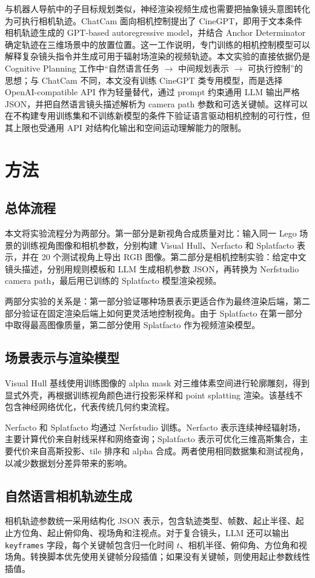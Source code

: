 \documentclass[a4paper, 12pt, centering]{article}
\begin{document}
与机器人导航中的子目标规划类似，神经渲染视频生成也需要把抽象镜头意图转化为可执行相机轨迹。ChatCam 面向相机控制提出了 CineGPT，即用于文本条件相机轨迹生成的 GPT-based autoregressive model，并结合 Anchor Determinator 确定轨迹在三维场景中的放置位置\cite{liu2024chatcam}。这一工作说明，专门训练的相机控制模型可以解释复杂镜头指令并生成可用于辐射场渲染的视频轨迹。本文实验的直接依据仍是 Cognitive Planning 工作中“自然语言任务 $\rightarrow$ 中间规划表示 $\rightarrow$ 可执行控制”的思想；与 ChatCam 不同，本文没有训练 CineGPT 类专用模型，而是选择 OpenAI-compatible API 作为轻量替代，通过 prompt 约束通用 LLM 输出严格 JSON，并把自然语言镜头描述解析为 camera path 参数和可选关键帧。这样可以在不构建专用训练集和不训练新模型的条件下验证语言驱动相机控制的可行性，但其上限也受通用 API 对结构化输出和空间运动理解能力的限制。

\section{方法}
\subsection{总体流程}
本文将实验流程分为两部分。第一部分是新视角合成质量对比：输入同一 Lego 场景的训练视角图像和相机参数，分别构建 Visual Hull、Nerfacto 和 Splatfacto 表示，并在 20 个测试视角上导出 RGB 图像。第二部分是相机控制实验：给定中文镜头描述，分别用规则模板和 LLM 生成相机参数 JSON，再转换为 Nerfstudio camera path，最后用已训练的 Splatfacto 模型渲染视频。

两部分实验的关系是：第一部分验证哪种场景表示更适合作为最终渲染后端，第二部分验证在固定渲染后端上如何更灵活地控制视角。由于 Splatfacto 在第一部分中取得最高图像质量，第二部分使用 Splatfacto 作为视频渲染模型。

\subsection{场景表示与渲染模型}
Visual Hull 基线使用训练图像的 alpha mask 对三维体素空间进行轮廓雕刻，得到显式外壳，再根据训练视角颜色进行投影采样和 point splatting 渲染。该基线不包含神经网络优化，代表传统几何约束流程。

Nerfacto 和 Splatfacto 均通过 Nerfstudio 训练。Nerfacto 表示连续神经辐射场，主要计算代价来自射线采样和网络查询；Splatfacto 表示可优化三维高斯集合，主要代价来自高斯投影、tile 排序和 alpha 合成。两者使用相同数据集和测试视角，以减少数据划分差异带来的影响。

\subsection{自然语言相机轨迹生成}
相机轨迹参数统一采用结构化 JSON 表示，包含轨迹类型、帧数、起止半径、起止方位角、起止俯仰角、视场角和注视点。对于复合镜头，LLM 还可以输出 \texttt{keyframes} 字段，每个关键帧包含归一化时间 $t$、相机半径、俯仰角、方位角和视场角。转换脚本优先使用关键帧分段插值；如果没有关键帧，则使用起止参数线性插值。
\end{document}
